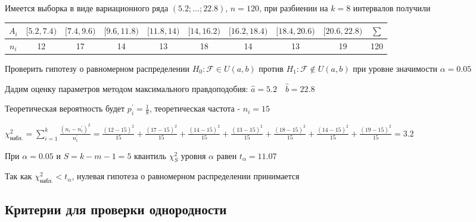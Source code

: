 \documentclass[12pt]{article}
\begin{document}
\Ex Имеется выборка в виде вариационного ряда $(5.2; \dots; 22.8)$, $n = 120$, при разбиении на $k = 8$ интервалов получили

\begin{tabular}{c|c|c|c|c|c|c|c|c|c}
    $A_i$ & $[5.2, 7.4)$ & $[7.4, 9.6)$ & $[9.6, 11.8)$ & $[11.8, 14)$ & $[14, 16.2)$ & $[16.2, 18.4)$ & $[18.4, 20.6)$ & $[20.6, 22.8)$ & $\sum$ \\
    \hline
    $n_i$ & 12 & 17 & 14 & 13 & 18 & 14 & 13 & 19 & 120
\end{tabular}

Проверить гипотезу о равномерном распределении $H_0 : \mathcal{F} \in U(a, b)$ против $H_1 : \mathcal{F} \not\in U(a, b)$ при уровне значимости $\alpha = 0.05$

Дадим оценку параметров методом максимального правдоподобия: $\hat a = 5.2 \quad \hat b = 22.8$

Теоретическая вероятность будет $p_i^\prime = \frac{1}{8}$, теоретическая частота - $n_i = 15$

$\chi^2_\text{набл.} = \sum_{i = 1}^k \frac{(n_i - n_i^\prime)^2}{n_i^\prime} = \frac{(12 - 15)^2}{15} + 
\frac{(17 - 15)^2}{15} + \frac{(14 - 15)^2}{15} + \frac{(13 - 15)^2}{15} + \frac{(18 - 15)^2}{15} + 
\frac{(14 - 15)^2}{15} + \frac{(19 - 15)^2}{15} = 3.2$

При $\alpha = 0.05$ и $S = k - m - 1 = 5$ квантиль $\chi^2_S$ уровня $\alpha$ равен $t_\alpha = 11.07$

Так как $\chi^2_\text{набл.} < t_\alpha$, нулевая гипотеза о равномерном распределении принимается

\subsection{Критерии для проверки однородности}
\end{document}
